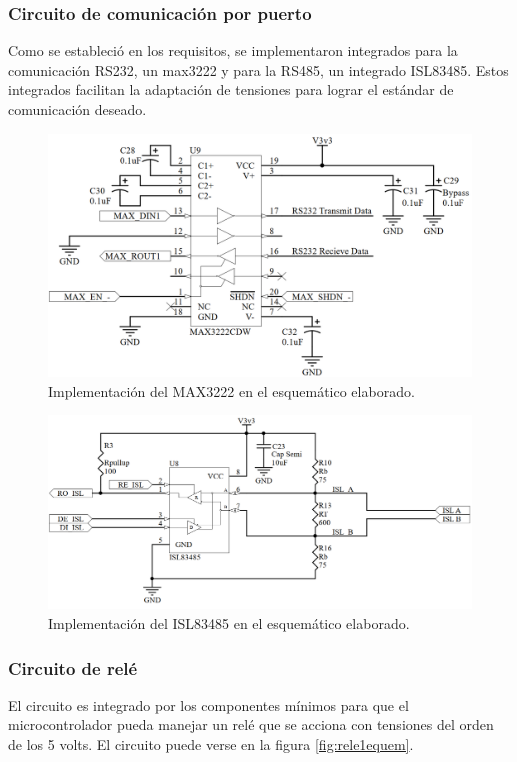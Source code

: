 \subsubsection{Circuito de comunicación por puerto}
Como se estableció en los requisitos, se implementaron integrados para la comunicación RS232, un max3222 y para la RS485, un integrado ISL83485. Estos integrados facilitan la adaptación de tensiones para lograr el estándar de comunicación deseado.

\begin{figure}[h]
	\centering
	\includegraphics[width=120mm,keepaspectratio]{Figures/RSS232_1.png}
	\caption{Implementación del MAX3222 en el esquemático elaborado.}
	\label{fig:2321esquem}
\end{figure}

\begin{figure}[h]
	\centering
	\includegraphics[width=120mm,keepaspectratio]{Figures/RSS485_1.png}
	\caption{Implementación del ISL83485 en el esquemático elaborado.}
	\label{fig:4851esquem}
\end{figure}


\subsubsection{Circuito de relé}
El circuito es integrado por los componentes mínimos para que el microcontrolador pueda manejar un relé que se acciona con tensiones del orden de los 5 volts. El circuito puede verse en la figura \ref{fig:rele1equem}.


